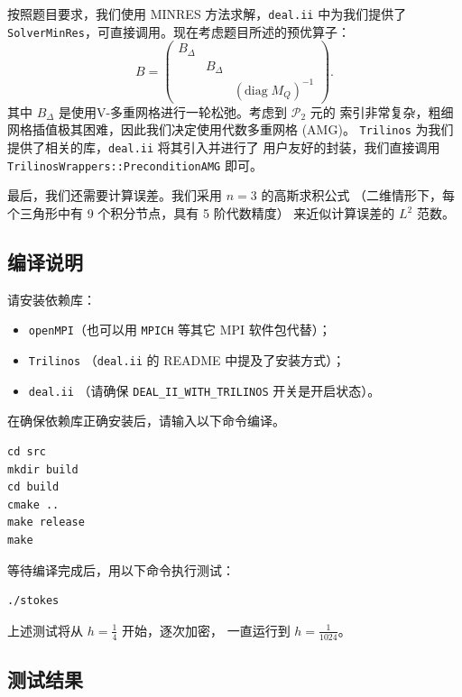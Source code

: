 \documentclass[lang=cn,11pt,a4paper]{elegantpaper}
\begin{document}
按照题目要求，我们使用 MINRES 方法求解，\verb|deal.ii| 中为我们提供了
\verb|SolverMinRes|，可直接调用。现在考虑题目所述的预优算子：
\begin{equation}
    B=\begin{pmatrix}
        B_\Delta & &\\
        & B_\Delta &\\
        & & (\text{diag}\; M_Q)^{-1}
    \end{pmatrix}.
\end{equation}
其中 $B_\Delta$ 是使用V-多重网格进行一轮松弛。考虑到 $\mathcal{P}_2$ 元的
索引非常复杂，粗细网格插值极其困难，因此我们决定使用代数多重网格 (AMG)。
\verb|Trilinos| 为我们提供了相关的库，\verb|deal.ii| 将其引入并进行了
用户友好的封装，我们直接调用 \verb|TrilinosWrappers::PreconditionAMG| 即可。

最后，我们还需要计算误差。我们采用 $n=3$ 的高斯求积公式
（二维情形下，每个三角形中有 9 个积分节点，具有 5 阶代数精度）
来近似计算误差的 $L^2$ 范数。

\subsection{编译说明}

请安装依赖库：
\begin{itemize}
    \item \verb|openMPI|（也可以用 \verb|MPICH| 等其它 MPI 软件包代替）；
    \item \verb|Trilinos| （\verb|deal.ii| 的 README 中提及了安装方式）；
    \item \verb|deal.ii| （请确保 \verb|DEAL_II_WITH_TRILINOS| 开关是开启状态）。
\end{itemize}

在确保依赖库正确安装后，请输入以下命令编译。
\begin{lstlisting}
cd src
mkdir build
cd build
cmake ..
make release
make
\end{lstlisting}
等待编译完成后，用以下命令执行测试：
\begin{lstlisting}
./stokes
\end{lstlisting}
上述测试将从 $h=\frac{1}{4}$ 开始，逐次加密，
一直运行到 $h=\frac{1}{1024}$。

\subsection{测试结果}
\end{document}
